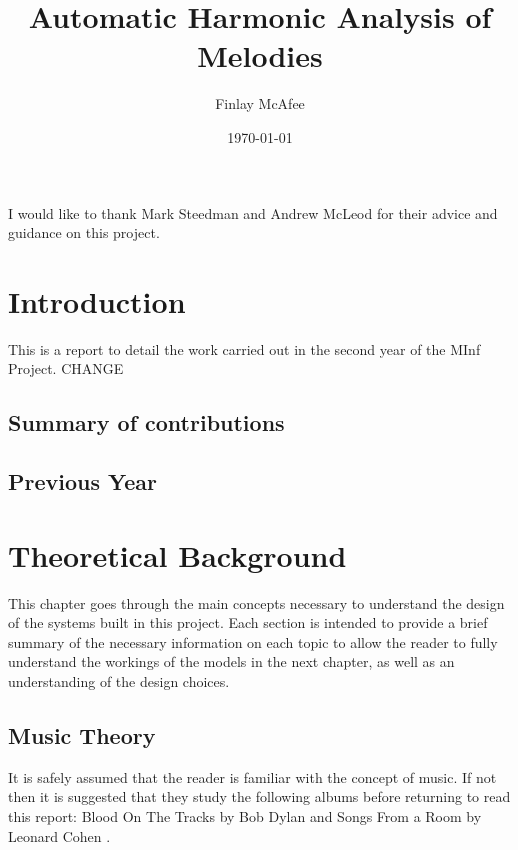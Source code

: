\documentclass[bsc,singlespacing,logo, parskip, deptreport]{infthesis}
\begin{document}
\title{Automatic Harmonic Analysis of Melodies}

\author{Finlay McAfee}


\date{\today}

\abstract{
}

\maketitle
\begin{acknowledgements}
I would like to thank Mark Steedman and Andrew McLeod for their advice and guidance on this project.
\end{acknowledgements}
\standarddeclaration
\tableofcontents


\chapter{Introduction}
This is a report to detail the work carried out in the second year of the MInf Project.
CHANGE
\section{Summary of contributions}

\section{Previous Year}


\chapter{Theoretical Background}
This chapter goes through the main concepts necessary to understand the design of the systems built in this project. Each section is intended to provide a brief summary of the necessary information on each topic to allow the reader to fully understand the workings of the models in the next chapter, as well as an understanding of the design choices.

\section{Music Theory}
It is safely assumed that the reader is familiar with the concept of music. If not then it is suggested that they study the following albums before returning to read this report: Blood On The Tracks by Bob Dylan \cite{dylan1975blood} and Songs From a Room by Leonard Cohen \cite{cohen2007songs}.
\end{document}
